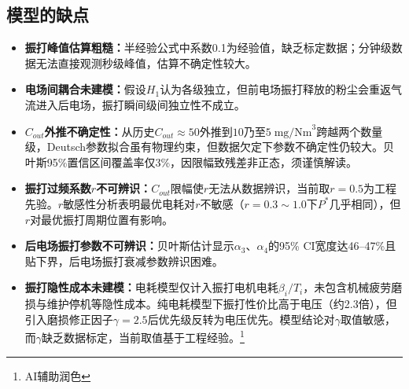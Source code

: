 
\subsection{模型的缺点}
\begin{itemize}[itemindent=2em]
\item \textbf{振打峰值估算粗糙：}半经验公式中系数0.1为经验值，缺乏标定数据；分钟级数据无法直接观测秒级峰值，估算不确定性较大。
\item \textbf{电场间耦合未建模：}假设$H_1$认为各级独立，但前电场振打释放的粉尘会重返气流进入后电场，振打瞬间级间独立性不成立。
\item \textbf{$C_{out}$外推不确定性：}从历史$C_{out}\approx 50$外推到$10$乃至$5\;\text{mg/Nm}^3$跨越两个数量级，Deutsch参数拟合虽有物理约束，但数据欠定下参数不确定性仍较大。贝叶斯95\%置信区间覆盖率仅3\%，因限幅致残差非正态，须谨慎解读。
\item \textbf{振打过频系数$r$不可辨识：}$C_{out}$限幅使$r$无法从数据辨识，当前取$r=0.5$为工程先验。$r$敏感性分析表明最优电耗对$r$不敏感（$r=0.3\sim1.0$下$P^*$几乎相同），但$r$对最优振打周期位置有影响。
\item \textbf{后电场振打参数不可辨识：}贝叶斯估计显示$\alpha_3$、$\alpha_4$的95\% CI宽度达46--47\%且贴下界，后电场振打衰减参数辨识困难。
\item \textbf{振打隐性成本未建模：}电耗模型仅计入振打电机电耗$\beta_i/T_i$，未包含机械疲劳磨损与维护停机等隐性成本。纯电耗模型下振打性价比高于电压（约2.3倍），但引入磨损修正因子$\gamma = 2.5$后优先级反转为电压优先。模型结论对$\gamma$取值敏感，而$\gamma$缺乏数据标定，当前取值基于工程经验。\footnote{AI辅助润色}
\end{itemize}